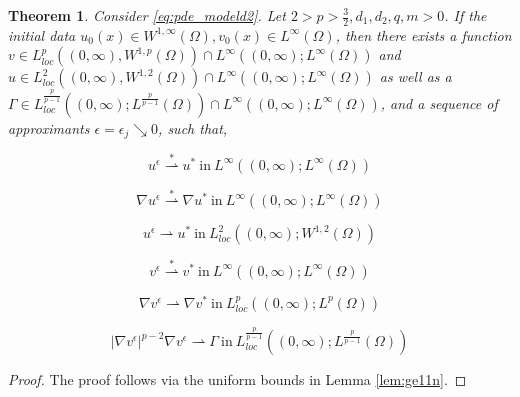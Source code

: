 \documentclass[10pt]{amsart}
\theoremstyle{plain}
\newtheorem{theorem}{Theorem}[section]
\theoremstyle{definition}
\begin{document}
\begin{theorem}
\label{thm:vubd}
    Consider \eqref{eq:pde_modeld2}. Let $2>p>\frac{3}{2}, d_{1}, d_{2}, q,m>0$. If the initial data $u_{0}(x) \in W^{1,\infty}(\Omega), v_{0}(x) \in L^{\infty}(\Omega)$, then there exists a function $v \in L^{p}_{loc}((0,\infty), W^{1,p}(\Omega)) \cap L^{\infty}((0,\infty);L^{\infty}(\Omega))$ and $u \in  L^{2}_{loc}((0,\infty), W^{1,2}(\Omega)) \cap L^{\infty}((0,\infty);L^{\infty}(\Omega))$  as well as a $\Gamma \in L^{\frac{p}{p-1}}_{loc}((0,\infty);L^{\frac{p}{p-1}}(\Omega)) \cap L^{\infty}((0,\infty);L^{\infty}(\Omega))$, and a sequence of approximants $\epsilon = \epsilon_{j} \searrow 0$, such that,

    \begin{equation}
u^{\epsilon} \overset{*}{\rightharpoonup} u^{*} \ \mbox{in} \ L^{\infty}((0,\infty);L^{\infty}(\Omega))
\end{equation}

\begin{equation}
\nabla u^{\epsilon} \overset{*}{\rightharpoonup} \nabla u^{*}  \ \mbox{in} \ L^{\infty}((0,\infty);L^{\infty}(\Omega))
\end{equation}


\begin{equation}
 u^{\epsilon} \rightharpoonup  u^{*}  \ \mbox{in} \ L^{2}_{loc}((0,\infty);W^{1,2}(\Omega))
\end{equation}




 \begin{equation}
v^{\epsilon} \overset{*}{\rightharpoonup} v^{*}  \ \mbox{in} \ L^{\infty}((0,\infty);L^{\infty}(\Omega))
\end{equation}


 \begin{equation}
 \label{eq:w1pv}
\nabla v^{\epsilon} \rightharpoonup \nabla v^{*}  \ \mbox{in} \ L^{p}_{loc}((0,\infty);L^{p}(\Omega))
\end{equation}


 \begin{equation}
|\nabla v^{\epsilon}|^{p-2}\nabla v^{\epsilon} \rightharpoonup  \Gamma \ \mbox{in} \ L^{\frac{p}{p-1}}_{loc}((0,\infty);L^{\frac{p}{p-1}}(\Omega))
\end{equation}


    
\end{theorem}

\begin{proof}
    The proof follows via the uniform bounds in Lemma \ref{lem:ge11n}.
\end{proof}
\end{document}
